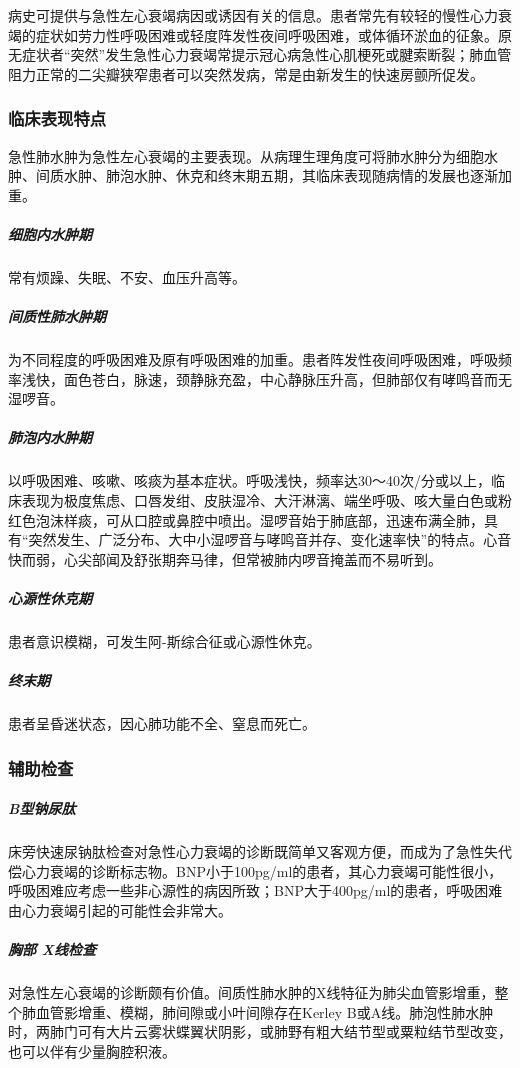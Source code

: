 病史可提供与急性左心衰竭病因或诱因有关的信息。患者常先有较轻的慢性心力衰竭的症状如劳力性呼吸困难或轻度阵发性夜间呼吸困难，或体循环淤血的征象。原无症状者“突然”发生急性心力衰竭常提示冠心病急性心肌梗死或腱索断裂；肺血管阻力正常的二尖瓣狭窄患者可以突然发病，常是由新发生的快速房颤所促发。

\subsubsection{临床表现特点}

急性肺水肿为急性左心衰竭的主要表现。从病理生理角度可将肺水肿分为细胞水肿、间质水肿、肺泡水肿、休克和终末期五期，其临床表现随病情的发展也逐渐加重。

\subparagraph{细胞内水肿期}

常有烦躁、失眠、不安、血压升高等。

\subparagraph{间质性肺水肿期}

为不同程度的呼吸困难及原有呼吸困难的加重。患者阵发性夜间呼吸困难，呼吸频率浅快，面色苍白，脉速，颈静脉充盈，中心静脉压升高，但肺部仅有哮鸣音而无湿啰音。

\subparagraph{肺泡内水肿期}

以呼吸困难、咳嗽、咳痰为基本症状。呼吸浅快，频率达30～40次/分或以上，临床表现为极度焦虑、口唇发绀、皮肤湿冷、大汗淋漓、端坐呼吸、咳大量白色或粉红色泡沫样痰，可从口腔或鼻腔中喷出。湿啰音始于肺底部，迅速布满全肺，具有“突然发生、广泛分布、大中小湿啰音与哮鸣音并存、变化速率快”的特点。心音快而弱，心尖部闻及舒张期奔马律，但常被肺内啰音掩盖而不易听到。

\subparagraph{心源性休克期}

患者意识模糊，可发生阿-斯综合征或心源性休克。

\subparagraph{终末期}

患者呈昏迷状态，因心肺功能不全、窒息而死亡。

\subsubsection{辅助检查}

\subparagraph{B型钠尿肽}

床旁快速尿钠肽检查对急性心力衰竭的诊断既简单又客观方便，而成为了急性失代偿心力衰竭的诊断标志物。BNP小于100pg/ml的患者，其心力衰竭可能性很小，呼吸困难应考虑一些非心源性的病因所致；BNP大于400pg/ml的患者，呼吸困难由心力衰竭引起的可能性会非常大。

\subparagraph{胸部 X线检查}

对急性左心衰竭的诊断颇有价值。间质性肺水肿的X线特征为肺尖血管影增重，整个肺血管影增重、模糊，肺间隙或小叶间隙存在Kerley
B或A线。肺泡性肺水肿时，两肺门可有大片云雾状蝶翼状阴影，或肺野有粗大结节型或粟粒结节型改变，也可以伴有少量胸腔积液。

